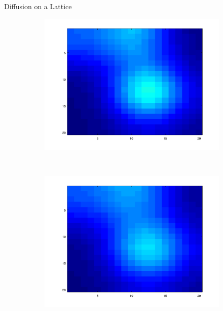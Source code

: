 \documentclass[10pt]{beamer}
\begin{document}
\begin{frame}{Diffusion on a Lattice}
\begin{figure}[!h]
\begin{subfigure}[b]{0.25\textwidth}
			\includegraphics[width=\textwidth]{images/anim_200.png}
		\end{subfigure}~
		\begin{subfigure}[b]{0.25\textwidth}
			\includegraphics[width= \textwidth]{images/anim_240.png}
		\end{subfigure}~
		\begin{subfigure}[b]{0.25\textwidth}

\end{subfigure}
\end{figure}
\end{frame}
\end{document}
